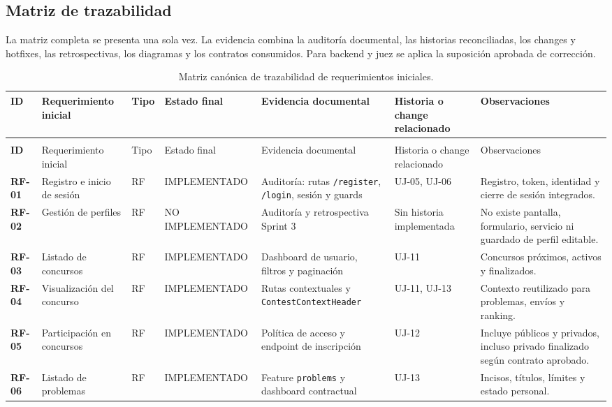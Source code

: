 \documentclass[11pt,a4paper]{article}
\begin{document}
\subsection{Matriz de trazabilidad}
\label{sec:matriz}
La matriz completa se presenta una sola vez. La evidencia combina la auditoría documental, las historias reconciliadas, los changes y hotfixes, las retrospectivas, los diagramas y los contratos consumidos. Para backend y juez se aplica la suposición aprobada de corrección.

\begin{landscape}
\begingroup
\setlength{\tabcolsep}{3pt}
\footnotesize
\begin{longtable}{>{\bfseries}p{1.25cm}p{4.0cm}p{1.15cm}p{3.35cm}p{4.5cm}p{4.0cm}p{5.1cm}}
\caption{Matriz canónica de trazabilidad de requerimientos iniciales.}\label{tab:trazabilidad}\\
\toprule
ID & Requerimiento inicial & Tipo & Estado final & Evidencia documental & Historia o change relacionado & Observaciones \\
\midrule
\endfirsthead
\multicolumn{7}{l}{\textit{Continuación de la Tabla~\ref{tab:trazabilidad}}}\\
\toprule
ID & Requerimiento inicial & Tipo & Estado final & Evidencia documental & Historia o change relacionado & Observaciones \\
\midrule
\endhead
\bottomrule
\endfoot
RF-01 & Registro e inicio de sesión & RF & IMPLEMENTADO & Auditoría: rutas \texttt{/register}, \texttt{/login}, sesión y guards & UJ-05, UJ-06 & Registro, token, identidad y cierre de sesión integrados. \\
RF-02 & Gestión de perfiles & RF & NO IMPLEMENTADO & Auditoría y retrospectiva Sprint 3 & Sin historia implementada & No existe pantalla, formulario, servicio ni guardado de perfil editable. \\
RF-03 & Listado de concursos & RF & IMPLEMENTADO & Dashboard de usuario, filtros y paginación & UJ-11 & Concursos próximos, activos y finalizados. \\
RF-04 & Visualización del concurso & RF & IMPLEMENTADO & Rutas contextuales y \texttt{ContestContextHeader} & UJ-11, UJ-13 & Contexto reutilizado para problemas, envíos y ranking. \\
RF-05 & Participación en concursos & RF & IMPLEMENTADO & Política de acceso y endpoint de inscripción & UJ-12 & Incluye públicos y privados, incluso privado finalizado según contrato aprobado. \\
RF-06 & Listado de problemas & RF & IMPLEMENTADO & Feature \texttt{problems} y dashboard contractual & UJ-13 & Incisos, títulos, límites y estado personal. \\

\end{longtable}
\end{landscape}
\end{document}
